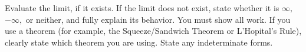 \documentclass[addpoints,12pt]{exam}
\begin{document}
\begin{questions}


\question Evaluate the limit, if it exists. If the limit does not exist, state whether it is $\infty,$
$-\infty,$ or neither, and fully explain its behavior. You must show all work. If you use a theorem
(for example, the Squeeze/Sandwich Theorem or L'Hopital's Rule), clearly state which theorem
you are using. State any indeterminate forms.

\end{questions}
\end{document}
